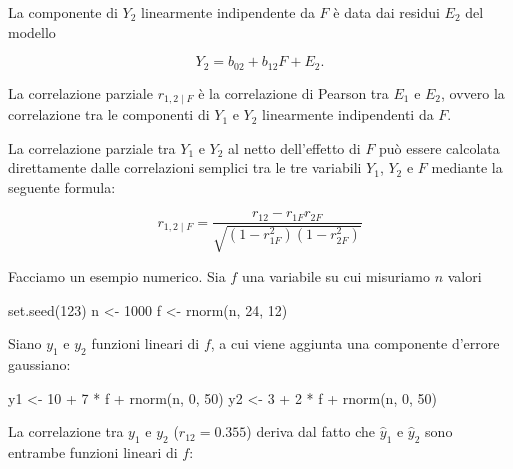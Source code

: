 \documentclass[
  11pt,
]{krantz}
\makeatletter
\newenvironment{Shaded}{\begin{snugshade}}{\end{snugshade}}
\newcommand{\DecValTok}[1]{\textcolor[rgb]{0.06,0.06,0.06}{#1}}
\newcommand{\FunctionTok}[1]{\textcolor[rgb]{0,0,0}{#1}}
\newcommand{\NormalTok}[1]{#1}
\newcommand{\OtherTok}[1]{\textcolor[rgb]{0.37,0.37,0.37}{#1}}
\newcommand{\SpecialCharTok}[1]{\textcolor[rgb]{0,0,0}{#1}}
\newenvironment{kframe}{%
\medskip{}
\setlength{\fboxsep}{.8em}
 \def\at@end@of@kframe{}%
 \ifinner\ifhmode%
  \def\at@end@of@kframe{\end{minipage}}%
  \begin{minipage}{\columnwidth}%
 \fi\fi%
 \def\FrameCommand##1{\hskip\@totalleftmargin \hskip-\fboxsep
 \colorbox{shadecolor}{##1}\hskip-\fboxsep
     \hskip-\linewidth \hskip-\@totalleftmargin \hskip\columnwidth}%
 \MakeFramed {\advance\hsize-\width
   \@totalleftmargin\z@ \linewidth\hsize
   \@setminipage}}%
 {\par\unskip\endMakeFramed%
 \at@end@of@kframe}
\renewenvironment{Shaded}{\begin{kframe}}{\end{kframe}}
\theoremstyle{definition}
\theoremstyle{definition}
\theoremstyle{definition}
\theoremstyle{definition}
\theoremstyle{remark}
\makeatother
\begin{document}
La componente di \(Y_2\) linearmente indipendente da \(F\) è data dai residui \(E_2\) del modello

\[
Y_2 = b_{02} + b_{12}F + E_2.
\]

La correlazione parziale \(r_{1,2 \mid F}\) è la correlazione di Pearson tra \(E_1\) e \(E_2\), ovvero la correlazione tra le componenti di \(Y_1\) e \(Y_2\) linearmente indipendenti da \(F\).

La correlazione parziale tra \(Y_1\) e \(Y_2\) al netto dell'effetto di \(F\) può essere calcolata direttamente dalle correlazioni semplici tra le tre variabili \(Y_1\), \(Y_2\) e \(F\) mediante la seguente formula:

\begin{equation}
r_{1,2 \mid F} = \frac{r_{12} - r_{1F}r_{2F}}{\sqrt{(1-r_{1F}^2)(1-r_{2F}^2)}}
\label{eq:corr-parz}
\end{equation}

Facciamo un esempio numerico. Sia \(f\) una variabile su cui misuriamo \(n\) valori

\begin{Shaded}
\begin{Highlighting}[]
\FunctionTok{set.seed}\NormalTok{(}\DecValTok{123}\NormalTok{)}
\NormalTok{n }\OtherTok{\textless{}{-}} \DecValTok{1000}
\NormalTok{f }\OtherTok{\textless{}{-}} \FunctionTok{rnorm}\NormalTok{(n, }\DecValTok{24}\NormalTok{, }\DecValTok{12}\NormalTok{)}
\end{Highlighting}
\end{Shaded}

Siano \(y_1\) e \(y_2\) funzioni lineari di \(f\), a cui viene aggiunta una componente d'errore gaussiano:

\begin{Shaded}
\begin{Highlighting}[]
\NormalTok{y1 }\OtherTok{\textless{}{-}} \DecValTok{10} \SpecialCharTok{+} \DecValTok{7} \SpecialCharTok{*}\NormalTok{ f }\SpecialCharTok{+} \FunctionTok{rnorm}\NormalTok{(n, }\DecValTok{0}\NormalTok{, }\DecValTok{50}\NormalTok{)}
\NormalTok{y2 }\OtherTok{\textless{}{-}} \DecValTok{3} \SpecialCharTok{+} \DecValTok{2} \SpecialCharTok{*}\NormalTok{ f }\SpecialCharTok{+} \FunctionTok{rnorm}\NormalTok{(n, }\DecValTok{0}\NormalTok{, }\DecValTok{50}\NormalTok{)}
\end{Highlighting}
\end{Shaded}

La correlazione tra \(y_1\) e \(y_2\) (\(r_{12}= 0.355\)) deriva dal fatto che \(\hat{y}_1\) e \(\hat{y}_2\) sono entrambe funzioni lineari di \(f\):
\end{document}
